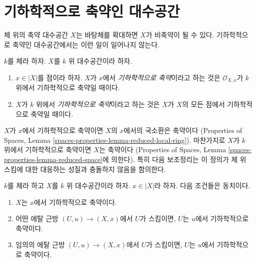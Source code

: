\section{기하학적으로 축약인 대수공간}
\label{section-geometrically-reduced}

\noindent
체 위의 축약 대수공간 $X$는 바탕체를 확대하면 $X$가 비축약이 될 수 있다. 기하학적으로
축약인 대수공간에서는 이런 일이 일어나지 않는다.

\begin{definition}
\label{definition-geometrically-reduced}
$k$를 체라 하자.
$X$를 $k$ 위 대수공간이라 하자.
\begin{enumerate}
\item $x \in |X|$를 점이라 하자. $X$가
$x$에서 {\it 기하학적으로 축약}이라고 하는 것은
$\mathcal{O}_{X, \overline{x}}$가 $k$ 위에서 기하학적으로 축약일 때이다.
\item $X$가 $k$ 위에서 {\it 기하학적으로 축약}이라고 하는 것은
$X$가 $X$의 모든 점에서 기하학적으로 축약일 때이다.
\end{enumerate}
\end{definition}

\noindent
$X$가 $x$에서 기하학적으로 축약이면 $X$의 $x$에서의 국소환은 축약이다
(Properties of Spaces, Lemma
\ref{spaces-properties-lemma-reduced-local-ring}).
마찬가지로 $X$가 $k$ 위에서 기하학적으로 축약이면 $X$는 축약이다
(Properties of Spaces, Lemma \ref{spaces-properties-lemma-reduced-space}에
의한다). 특히 다음 보조정리는 이 정의가 체 위 스킴에 대한 대응하는 성질과
충돌하지 않음을 함의한다.

\begin{lemma}
\label{lemma-geometrically-reduced-at-point}
$k$를 체라 하고 $X$를 $k$ 위 대수공간이라 하자.
$x \in |X|$라 하자. 다음 조건들은 동치이다.
\begin{enumerate}
\item $X$는 $x$에서 기하학적으로 축약이다.
\item 어떤 에탈 근방 $(U, u) \to (X, x)$에서 $U$가 스킴이면,
$U$는 $u$에서 기하학적으로 축약이다.
\item 임의의 에탈 근방 $(U, u) \to (X, x)$에서 $U$가 스킴이면,
$U$는 $u$에서 기하학적으로 축약이다.
\end{enumerate}
\end{lemma}

